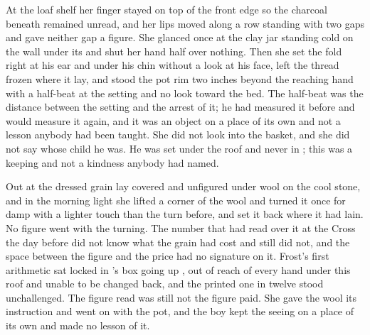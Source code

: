 At the loaf shelf her finger stayed on top of the front edge so the charcoal beneath remained unread, and her lips moved along a row standing with two gaps and gave neither gap a figure. She glanced once at the clay jar standing cold on the wall under its  and shut her hand half over nothing. Then she set the fold right at his ear and under his chin without a look at his face, left the thread frozen where it lay, and stood the pot rim two inches beyond the reaching hand with a half-beat at the setting and no look toward the bed. The half-beat was the distance between the setting and the arrest of it; he had measured it before and would measure it again, and it was an object on a place of its own and not a lesson anybody had been taught. She did not look into the basket, and she did not say whose child he was. He was set under the roof and never in ; this was a keeping and not a kindness anybody had named.

Out at  the dressed grain lay covered and unfigured under wool on the cool stone, and in the morning light she lifted a corner of the wool and turned it once for damp with a lighter touch than the turn before, and set it back where it had lain. No figure went with the turning. The number that had read over it at the Cross the day before did not know what the grain had cost and still did not, and the space between the figure and the price had no signature on it. Frost’s first arithmetic sat locked in ’s box going up , out of reach of every hand under this roof and unable to be changed back, and the printed one in twelve stood unchallenged. The figure read was still not the figure paid. She gave the wool its instruction and went on with the pot, and the boy kept the seeing on a place of its own and made no lesson of it.

